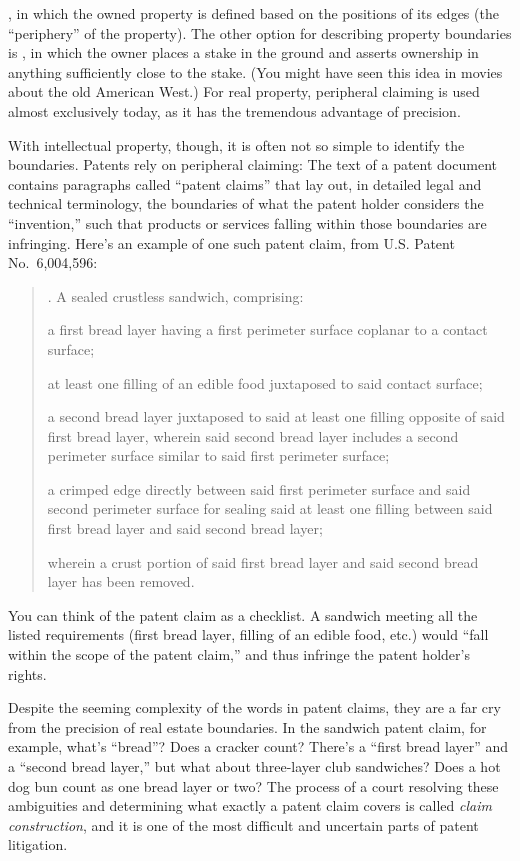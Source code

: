 , in which the owned property is defined based on the
positions of its edges (the ``periphery'' of the property). The other option for
describing property boundaries is , in which the owner
places a stake in the ground and asserts ownership in anything sufficiently
close to the stake. (You might have seen this idea in movies about the old
American West.) For real property, peripheral claiming is used almost
exclusively today, as it has the tremendous advantage of precision.

With intellectual property, though, it is often not so simple to identify the
boundaries. Patents rely on peripheral claiming: The text of a patent
document
contains paragraphs called ``patent claims'' that lay out, in detailed legal and
technical terminology, the boundaries of what the patent holder considers the
``invention,'' such that products or services falling within those boundaries
are infringing. Here's an example of one such patent claim, from U.S. Patent
No.~6,004,596:
\begin{quotation}
. A sealed crustless sandwich, comprising:

a first bread layer having a first perimeter surface coplanar to a contact
surface;

at least one filling of an edible food juxtaposed to said contact surface;

a second bread layer juxtaposed to said at least one filling opposite of
said first bread layer, wherein said second bread layer includes a second
perimeter surface similar to said first perimeter surface;

a crimped edge directly between said first perimeter surface and said
second perimeter surface for sealing said at least one filling between said
first bread layer and said second bread layer;

wherein a crust portion of said first bread layer and said second bread
layer has been removed.
\end{quotation}
You can think of the patent claim as a checklist. A sandwich meeting all the
listed requirements (first bread layer, filling of an edible food, etc.) would
``fall within the scope of the patent claim,'' and thus infringe the patent
holder's rights.

Despite the seeming complexity of the words in patent claims, they are a far cry
from the precision of real estate boundaries. In the sandwich patent claim, for
example, what's ``bread''? Does a cracker count? There's a ``first bread layer''
and a ``second bread layer,'' but what about three-layer club sandwiches? Does a
hot dog bun count as one bread layer or two? The process of a court resolving
these ambiguities and determining what exactly a patent claim covers is called
\emph{claim construction}, and it is one of the most difficult and uncertain
parts of patent litigation.


